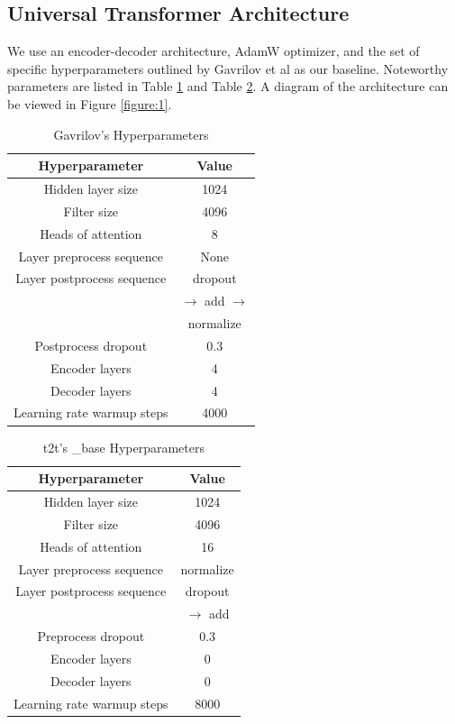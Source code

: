 \documentclass[11pt]{article}
\begin{document}
\subsection{Universal Transformer Architecture}
We use an encoder-decoder architecture, AdamW optimizer, and the set of specific hyperparameters outlined by Gavrilov et al \cite{DBLP:journals/corr/abs-1901-07786} as our baseline. Noteworthy parameters are listed in Table \ref{table:hparam_gav} and Table \ref{table:hparam_base}. A diagram of the architecture can be viewed in Figure \ref{figure:1}.

\begin{table}[h!]
\centering
\begin{tabular}{|c | c|} 
 \hline
 Hyperparameter & Value \\ [0.5ex] 
 \hline
 Hidden layer size & 1024 \\ 
 Filter size & 4096 \\
 Heads of attention & 8 \\
 Layer preprocess sequence & None \\
 Layer postprocess sequence & dropout \\
 & $\rightarrow$ add $\rightarrow$ \\
 & normalize \\
 Postprocess dropout & 0.3 \\
 Encoder layers & 4 \\
 Decoder layers & 4 \\
 Learning rate warmup steps & 4000 \\ [1ex]
 \hline
\end{tabular}
\caption{Gavrilov's Hyperparameters}
\label{table:hparam_gav}
\end{table}

\begin{table}[h!]
\centering
\begin{tabular}{|c | c|} 
 \hline
 Hyperparameter & Value \\ [0.5ex] 
 \hline
 Hidden layer size & 1024 \\ 
 Filter size & 4096 \\
 Heads of attention & 16 \\
 Layer preprocess sequence & normalize \\
 Layer postprocess sequence & dropout \\
 & $\rightarrow$ add \\
 Preprocess dropout & 0.3 \\
 Encoder layers & 0 \\
 Decoder layers & 0 \\
 Learning rate warmup steps & 8000 \\ [1ex]
 \hline
\end{tabular}
\caption{t2t's \_base Hyperparameters}
\label{table:hparam_base}
\end{table}
\end{document}
